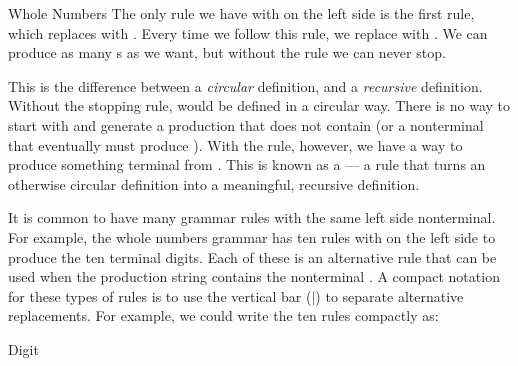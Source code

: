 \begin{examplenobar}{Whole Numbers}
The only rule we have with  on the left side is the first rule, which replaces  with  .  Every time we follow this rule, we replace  with  .  We can produce as many s as we want, but without the  rule we can never stop.  

This is the difference between a \emph{circular} definition, and a \emph{recursive} definition.  Without the stopping rule,  would be defined in a circular way.  There is no way to start with  and generate a production that does not contain  (or a nonterminal that eventually must produce ).  With the  rule, however, we have a way to produce something terminal from .  This is known as a  --- a rule that turns an otherwise circular definition into a meaningful, recursive definition.  

It is common to have many grammar rules with the same left side nonterminal.  For example, the whole numbers grammar has ten rules with  on the left side to produce the ten terminal digits.  Each of these is an alternative rule that can be used when the production string contains the nonterminal .  A compact notation for these types of rules is to use the vertical bar ($\mid$) to separate alternative replacements.  For example, we could write the ten  rules compactly as:
\begin{bnfgrammarm}{Digit}
\end{bnfgrammarm} 


\end{examplenobar}
